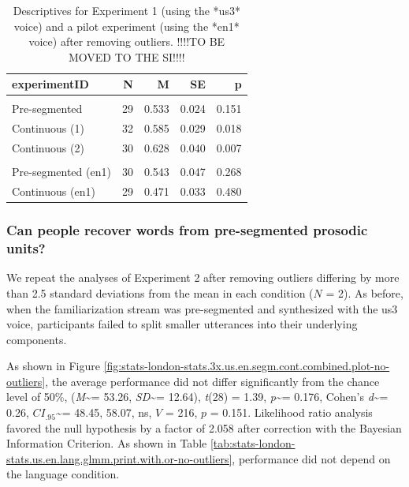 \documentclass[
]{article}
\newcommand{\T}{{\em t\/}}
\newcommand{\p}{{\em p\/}}
\newcommand{\M}{{\em M\/}}
\newcommand{\SD}{{\em SD\/}}
\newcommand{\D}{Cohen's {\em d\/}}
\newcommand{\CI}{$CI_{.95}$}
\begin{document}
\begin{longtable}[t]{lrrrr}
\caption{\label{tab:stats-london-descriptives-no-outliers}Descriptives for Experiment 1 (using the *us3* voice) and a pilot experiment (using the *en1* voice) after removing outliers. !!!!TO BE MOVED TO THE SI!!!!}\\
\toprule
experimentID & N & M & SE & p\\
\midrule
\addlinespace[0.3em]
\multicolumn{5}{l}{\textbf{us3}}\\
\hspace{1em}Pre-segmented & 29 & 0.533 & 0.024 & 0.151\\
\hspace{1em}Continuous (1) & 32 & 0.585 & 0.029 & 0.018\\
\hspace{1em}Continuous (2) & 30 & 0.628 & 0.040 & 0.007\\
\addlinespace[0.3em]
\multicolumn{5}{l}{\textbf{en1}}\\
\hspace{1em}Pre-segmented (en1) & 30 & 0.543 & 0.047 & 0.268\\
\hspace{1em}Continuous (en1) & 29 & 0.471 & 0.033 & 0.480\\
\bottomrule
\end{longtable}

\subsubsection{Can people recover words from pre-segmented prosodic
units?}\label{can-people-recover-words-from-pre-segmented-prosodic-units-1}

We repeat the analyses of Experiment 2 after removing outliers differing
by more than 2.5 standard deviations from the mean in each condition
(\(N\) = 2). As before, when the familiarization stream was
pre-segmented and synthesized with the us3 voice, participants failed to
split smaller utterances into their underlying components.

As shown in Figure
\ref{fig:stats-london-stats.3x.us.en.segm.cont.combined.plot-no-outliers},
the average performance did not differ significantly from the chance
level of 50\%, (\M\textasciitilde= 53.26, \SD\textasciitilde= 12.64),
\T(28) = 1.39, \p\textasciitilde= 0.176, \D\textasciitilde= 0.26,
\CI\textasciitilde= 48.45, 58.07, ns, \(V\) = 216, \(p\) = 0.151.
Likelihood ratio analysis favored the null hypothesis by a factor of
2.058 after correction with the Bayesian Information Criterion. As shown
in Table
\ref{tab:stats-london-stats.us.en.lang.glmm.print.with.or-no-outliers},
performance did not depend on the language condition.
\end{document}

